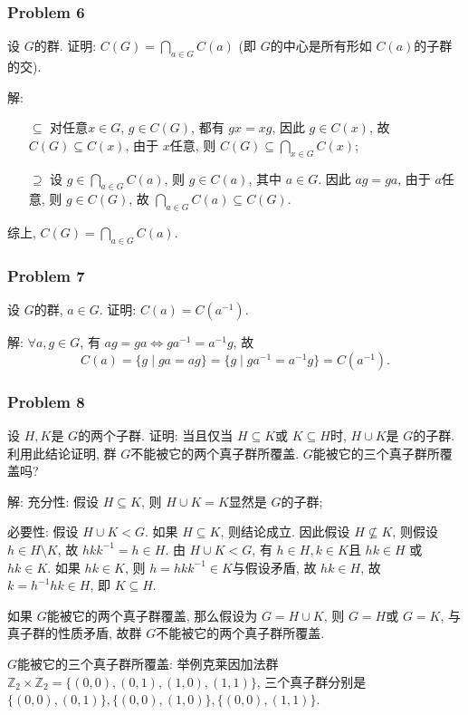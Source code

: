 \documentclass[a4paper,12pt]{ctexart}
\newcommand{\Z}{\mathbb{Z}}
\begin{document}
\subsubsection*{Problem 6}
  设 $ G $的群. 证明: $ C(G)=\bigcap_{a\in G}C(a) $ (即 $ G $的中心是所有形如 $ C(a) $的子群的交).

  解: \begin{enumerate}
    \item[$ \subseteq $] 对任意$ x\in G $, $ g\in C(G) $, 都有 $ gx=xg $, 因此 $ g\in C(x) $, 故 $ C(G)\subseteq C(x) $, 由于 $ x $任意, 则 $ C(G)\subseteq\bigcap_{x\in G}C(x) $;
    \item[$ \supseteq $] 设 $ g\in\bigcap_{a\in G}C(a) $, 则 $ g\in C(a) $, 
    其中 $ a\in G $. 因此 $ ag=ga $, 由于 $ a $任意, 则 $ g\in C(G) $, 故 $ \bigcap_{a\in G}C(a)\subseteq C(G) $.
  \end{enumerate}
  综上,  $ C(G)=\bigcap_{a\in G}C(a) $.

\subsubsection*{Problem 7}
  设 $ G $的群, $ a\in G $. 证明: $ C(a)=C(a^{-1}) $.

  解: $ \forall a,g\in G $, 有 $ ag=ga\Leftrightarrow ga^{-1}=a^{-1}g $, 故 
  \[C(a)=\{g\mid ga=ag\}=\{g\mid ga^{-1}=a^{-1}g\}=C(a^{-1}).\]
  
\subsubsection*{Problem 8}
  设 $ H,K $是 $ G $的两个子群. 证明: 当且仅当 $ H\subseteq K $或 $ K\subseteq H $时, $ H\cup K $是 $ G $的子群. 
  利用此结论证明, 群 $ G $不能被它的两个真子群所覆盖. $ G $能被它的三个真子群所覆盖吗?

  解: 充分性: 假设 $ H\subseteq K $, 则 $ H\cup K=K $显然是 $ G $的子群;

  必要性: 假设 $ H\cup K<G $. 如果 $ H\subseteq K $, 则结论成立. 
  因此假设 $ H\nsubseteq K $, 则假设 $ h\in H\setminus K $, 故 $ hkk^{-1}=h\in H $.
  由 $ H\cup K<G $, 有 $ h\in H,k\in K $且 $ hk\in H $ 或 $ hk\in K $. 如果 $ hk\in K $, 则 $ h=hkk^{-1}\in K $与假设矛盾, 故 $ hk\in H $, 故 $ k=h^{-1}hk\in H $, 
  即 $ K\subseteq H $.

  如果 $ G $能被它的两个真子群覆盖, 那么假设为 $ G=H\cup K $, 则 $ G=H $或 $ G=K $, 与真子群的性质矛盾, 故群 $ G $不能被它的两个真子群所覆盖.

  $ G $能被它的三个真子群所覆盖: 
  举例克莱因加法群 $ \Z_2\times\Z_2=\{(0,0),(0,1),(1,0),(1,1)\} $, 三个真子群分别是
  $ \{(0,0),(0,1)\},\{(0,0),(1,0)\},\{(0,0),(1,1)\} $.
\end{document}
